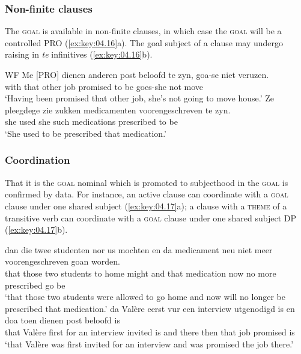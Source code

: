 \documentclass[output=paper]{langsci/langscibook}
\begin{document}
\subsubsection{Non-finite clauses}

The \textsc{goal}  is available in non-finite 
clauses, in which case the \textsc{goal} will be a controlled PRO
(\ref{ex:key:04.16}a). The goal subject of a  clause may undergo
raising in \emph{te} infinitives (\ref{ex:key:04.16}b).

\ea%
    \label{ex:key:04.16}\glsdesc{WF}
    \ea
	\gll   Me   [PRO]  dienen   anderen   post   beloofd   te   zyn, goa-se     niet   veruzen.\\
    with {}    that   other     job   promised   to   be goes-she   not   move\\
	\glt   ‘Having been promised that other job, she’s not going to move house.’
    \ex
	\gll   Ze   pleegdege   zie   zukken   medicamenten voorengeschreven   te zyn.\\
		    she   used     she  such   medications prescribed     to be\\
	\glt     ‘She used to be prescribed that medication.’
    \z
\z

\subsubsection{Coordination}

That it is the \textsc{goal} nominal which is promoted to subjecthood in the
\textsc{goal}  is confirmed by  data. For instance, an
active clause can coordinate with a \textsc{goal}  clause under
one shared subject (\ref{ex:key:04.17}a); a clause with a \textsc{theme}
 of a transitive verb can coordinate with a \textsc{goal}
 clause under one shared subject DP (\ref{ex:key:04.17}b).

\ea%
    \label{ex:key:04.17}
    \ea
	\gll   dan   die   twee   studenten   nor us     mochten en   da medicament    neu  niet   meer voorengeschreven   goan   worden.\\
		  that  those   two   students   to home   might and   that medication   now  no   more prescribed     go   be\\
	\glt ‘that those two students were allowed to go home and now will no longer be prescribed that medication.’
    \ex
	\gll   da   Valère  eerst  vur   een interview     utgenodigd   is en   doa   toen  dienen   post   beloofd   is\\
		that  Valère  first  for   an interview    invited   is and   there  then  that   job   promised   is\\
	\glt     ‘that Valère was first invited for an interview and was promised the job there.’
    \z
\z
\end{document}
